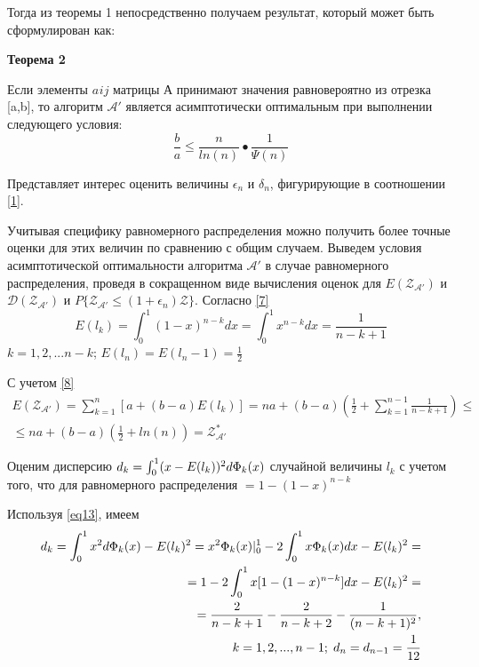 \documentclass[a4paper, 14pt]{extarticle}
\begin{document}
Тогда из теоремы 1 непосредственно получаем результат, который может быть сформулирован как:

\textbf{Теорема 2}

Если элементы $a_{}ij$ матрицы А принимают значения равновероятно из отрезка [a,b], то алгоритм $\mathcal{A'}$ является асимптотически оптимальным при выполнении следующего условия:
\begin{equation}
\frac{b}{a} \leq \frac{n}{ln(n)}•\frac{1}{\Psi(n)}
\end{equation}

Представляет интерес оценить величины $\epsilon_n$ и $\delta_n$, фигурирующие в соотношении \eqref{1}.

Учитывая специфику равномерного распределения можно получить более точные оценки для этих величин по сравнению с общим случаем. Выведем условия асимптотической оптимальности алгоритма $\mathcal{A'}$ в случае равномерного распределения, проведя в сокращенном виде вычисления оценок для $E(\mathcal{Z_{A'}})$ и $\mathcal{D(Z_{A'})}$ и $P \{ \mathcal{Z_{A'}} \leq (1+\epsilon_n)\mathcal{Z} \}$. Согласно \eqref{7}
\begin{equation}\label{eq13} 
E(l_k) = \int_0^1 (1-x)^{n-k}dx = \int_0^1 x^{n-k}dx = \frac{1}{n-k+1}
\end{equation}
$k=1,2,...n-k$;   $ E(l_n) = E(l_n-1) = \frac{1}{2}$

С учетом \eqref{8}
\begin{equation}
\begin{aligned}
E(\mathcal{Z_{A'}}) = \sum_{k=1}^{n} [a+(b-a)E(l_k)] = na +(b-a)(\frac{1}{2}+\sum_{k=1}^{n-1} \frac{1}{n-k+1}) \leq \\
\leq na+(b-a)(\frac{1}{2} + ln(n)) = \mathcal{Z^*_{A'}}
\end{aligned}
\end{equation}

Оценим дисперсию $d_k=\int_0^1 (x-E(l_k))^2 d\text{$\Phi_k(x)$}$ случайной величины $l_k$ с учетом того, что для равномерного распределения \chanceLklesserX $ = 1-(1-x)^{n-k}$

Используя \eqref{eq13}, имеем
\begin{equation}
\begin{aligned}
d_k = \int_0^1 x^2 d \text{$\Phi_k(x)$}-E(l_k)^2=x^2 \text{$\Phi_k(x)$} 	
|_0^1 - 2 \int_0^1 x \text{$\Phi_k(x)$}dx - E(l_k)^2=\\
= 1-2\int_0^1 x[1-(1-x)^{n-k}]dx-E(l_k)^2 =\\
= \frac{2}{n-k+1} - \frac{2}{n-k+2} - \frac{1}{(n-k+1)^2}, \\ 
\; k=1,2,...,n-1; \; d_n = d_{n-1} = \frac{1}{12}
\end{aligned}
\end{equation}
\end{document}
